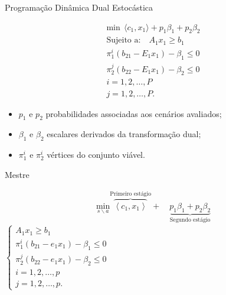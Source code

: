 \documentclass[12pt]{beamer}%
\begin{document}
\begin{frame}{Programa\c c\~ao Din\^amica Dual Estoc\'astica}
	\begin{justify}	
		\begin{align*}
		{\text{min}} \ \ \langle c_1,x_1\rangle + p_1 {\beta}_{1} + p_2 {\beta}_{2} \\
		\textrm{Sujeito a:} \quad A_1 x_1 \geq b_1 \\
		{\pi}_{1}^{i}(b_{21} - E_1x_1) - {\beta}_{1} \leq 0 \\ 
		{\pi}_{2}^{j}(b_{22} - E_1x_1) - {\beta}_{2} \leq 0 \\ 
		i = 1, 2, \dots , P \\
		j = 1, 2, \dots , P. 
		\end{align*}
		\begin{itemize}
			\item $p_1$ e $p_2$ probabilidades associadas aos cen\'arios avaliados;
			\item $\beta_1$ e $\beta_2$ escalares derivados da transforma\c c\~ao dual;
			\item ${\pi}_{1}^{i}$ e ${\pi}_{2}^{i}$ v\'ertices do conjunto vi\'avel.
		\end{itemize}
	\end{justify}
\end{frame}

\begin{frame}{Mestre}
	\begin{justify}	
		\begin{align*}
		 \underset {s \backslash a}{\text{min}} \overbrace{\left < c_1,x_1\right >}^{\textrm{Primeiro estágio}} 
		 +\quad \underbrace {p_1 {\beta}_{1} + p_2 {\beta}_{2}}_{\textrm{Segundo estágio}}
		\end{align*}
		$\left \{ 
	 \begin{aligned}
		 A_1 x_1 \geq b_1 \\
		{\pi}_{1}^{i}(b_{21} - e_1x_1) - {\beta}_{1} \leq 0 \\ 
		{\pi}_{2}^{j}(b_{22} - e_1x_1) - {\beta}_{2} \leq 0 \\ 
		i = 1, 2, \dots , p \\
		j = 1, 2, \dots , p. 
	 \end{aligned}
	\right . 
	$
	\end{justify}
\end{frame}
\end{document}
